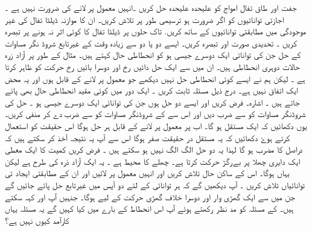  جفت اور طاق تفال امواج کو علیحدہ علیحدہ حل کریں ۔انہیں معمول پر لانے کی ضرورت نہیں ہے ۔ اجازتی توانائیوں کو اگر ضرورت ہو ترسیمی طور پر تلاش کریں۔ ان کا موازنہ ڈیلٹا تفال کی غیر موجودگی میں مطابقتی  توانائیوں کے ساتھ کریں.  تاک حلوں پر   ڈیلٹا تفال کا کوئی اثر نہ ہونے پر تبصرہ کریں ۔ تحدیدی صورت  اور  تبصرہ کریں۔ 
 ایسے دو یا دو سے زیادہ وقت کے غیرتابع شروڈ نگر مساوات کے حل جن کی توانائی  ایک دوسرے جیسی ہو کو انحطاطی حال کہتے ہیں۔ مثال کے طور پر آزاد زرہ حالات دوہری انحطاطی ہیں۔  ان میں سے ایک حل دائیں رخ اور دوسرا بائیں رخ حرکت کو ظاہر کرتا ہے ۔  لیکن ہم نے ایسے کوئی انحطاطی حل نہیں دیکھے جو معمول پر لانے کے قابل ہوں اور یہ محض ایک اتفاق نہیں ہے۔ 
 درج ذیل مسئلہ ثابت کریں ۔
ایک دور میں کوئی مقید  انحطاطی حال بھی پائے جاتے ہیں ۔ 
اشارہ۔ فرض کریں
  اور  ایسے دو حل ہوں جن کی توانائی  ایک دوسرے جیسی ہو ۔ 
حل  کی شروڈنگر  مساوات کو  سے  ضرب دیں اور اس سے کے شروڈنگر مساوات کو  سے ضرب دے کر منفی کریں۔  یوں دکھائیں کہ  ایک مستقل ہو گا۔
 اب پر معمول پر لانے کے قابل ہر حل ہوگا اس حقیقت کو استعمال کرتے ہوۓ دکھائیں کہ یہ مستقل در حقیقت صفر ہوگا اس سے آپ یہ نتیجہ آخذ کر سکتے ہیں کہ  دراصل  کا مضرب ہو گا لہذا یہ دو حل الگ الگ نہیں ہو سکتے ہیں ۔
فرض کریں کمیت   کا ایک معطی ایک دایری چھلا پر بےرگڑ حرکت کرتا ہے۔ چھلے کا محیط  ہے ۔ یہ ایک آزاد ذرہ کی طرح ہے لیکن یہاں ہوگا۔  اس کے ساکن حال تلاش کریں اور انہیں معمول پر لائیں اور ان کے مطابقتی ایجاد تی توانائیاں تلاش کریں ۔
 آپ دیکھیں گے کہ ہر توانائی کے لئے دو آپس میں غیرتابع حل پائے جائیں گے جن میں سے ایک گھڑی وار اور دوسرا خلاف گھڑی حرکت کے لیے ہوگا۔ جنہیں آپ اور  کہہ سکتے ہیں۔
کے مسئلہ  کو مد نظر رکھتے ہوئے آپ اس انحطاط کے بارے میں کیا کہیں گے یہ مسئلہ یہاں کارآمد کیوں نہیں ہے؟  
